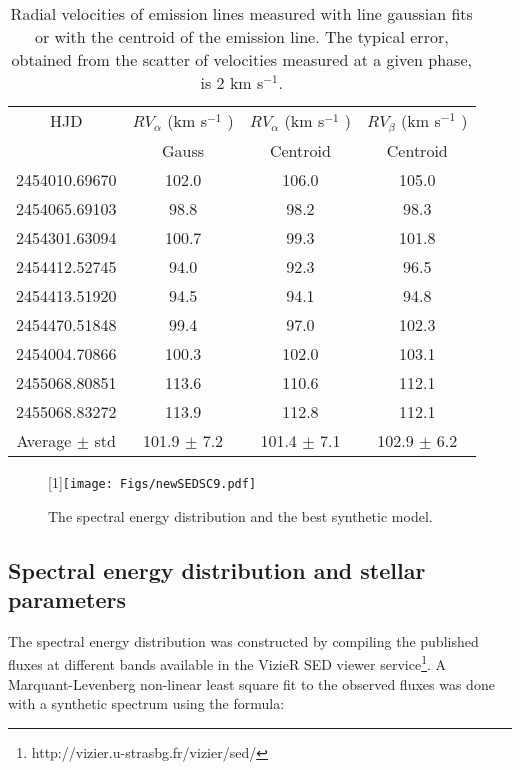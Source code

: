 \documentclass[useAMS,usenatbib]{mn2e}
\begin{document}
\begin{table}
\centering
 \caption{Radial velocities of emission lines  measured with line gaussian fits or with the centroid of
 the emission line.  The typical error,  obtained from the scatter of velocities measured at a given phase, is 2  km s$^{-1}$. }
 \begin{tabular}{@{}cccc@{}}
 \hline
HJD& $RV_{\alpha}$ (km s$^{-1}$ )&$RV_{\alpha}$ (km s$^{-1}$ )&$RV_{\beta}$ (km s$^{-1}$ )  \\
&Gauss &Centroid  & Centroid  \\
\hline
2454010.69670&  102.0	&106.0 &  105.0 \\
2454065.69103 & 98.8& 	98.2   &98.3\\
2454301.63094 & 100.7&	99.3  &101.8\\
2454412.52745  &94.0	&92.3 & 96.5\\
2454413.51920 & 94.5	 &94.1  &94.8\\
2454470.51848  &99.4&	97.0 & 102.3\\
2454004.70866 & 100.3&	102.0 & 103.1\\
2455068.80851  &113.6&	110.6  &112.1\\
2455068.83272 & 113.9&	112.8  &112.1\\
\hline
Average $\pm$ std &101.9 $\pm$ 7.2 &101.4 $\pm$ 7.1 &102.9 $\pm$ 6.2 \\
\hline
\end{tabular}
\end{table}



 \begin{figure}
\scalebox{1}[1]{\texttt{[image: Figs/newSEDSC9.pdf]}}
\caption{The spectral energy distribution and the best synthetic model.}
  \label{x}
\end{figure}

\subsection{Spectral energy distribution and stellar parameters}

The spectral energy distribution was constructed by compiling the published fluxes at different bands available in the VizieR SED viewer service\footnote{http://vizier.u-strasbg.fr/vizier/sed/}. A Marquant-Levenberg non-linear least square fit to the observed fluxes was done with a synthetic spectrum using the formula:\\
\end{document}
